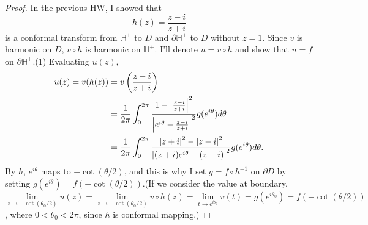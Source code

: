 \documentclass{article}
\begin{document}
\begin{enumerate}
\begin{proof}
In the previous HW, I showed that 
\begin{equation*}
h(z)=\frac{z-i}{z+i}
\end{equation*}
is a conformal transform from $\mathbb{H}^+$ to $D$ and $\partial \mathbb{H}^+$ to $D$ without $z=1$. Since $v$ is harmonic on $D$, $v\circ h$ is harmonic on $\mathbb{H}^+$. I'll denote $u=v\circ h$ and show that $u=f$ on $\partial \mathbb{H}^+$.(1) Evaluating $u(z)$,
\begin{equation*}
\begin{split}
u(z)=v(h(z))&=v\left(\frac{z-i}{z+i}\right) \\
&=\frac{1}{2\pi}\int_0^{2\pi}\frac{1-\abs{\frac{z-i}{z+i}}^2}{\abs{e^{i\theta}-\frac{z-i}{z+i}}^2}g(e^{i\theta})d\theta \\
&=\frac{1}{2\pi}\int_0^{2\pi}\frac{\abs{z+i}^2-\abs{z-i}^2}{\abs{(z+i)e^{i\theta}-(z-i)}^2}g(e^{i\theta})d\theta.
\end{split}
\end{equation*}
By $h$, $e^{i\theta}$ maps to $-\cot\left(\theta/2\right)$, and this is why I set $g=f\circ h^{-1}$ on $\partial D$ by setting $g(e^{i\theta})=f(-\cot(\theta/2))$.(If we consider the value at boundary, $\lim\limits_{z\rightarrow -\cot(\theta_0/2)} u(z)=\lim\limits_{z\rightarrow -\cot(\theta_0/2)} v\circ h(z)=\lim\limits_{t\rightarrow e^{i\theta_0}} v(t)=g(e^{i\theta_0})=f(-\cot(\theta/2))$, where $0<\theta_0<2\pi$, since $h$ is conformal mapping.)


\end{proof}
\end{enumerate}
\end{document}
